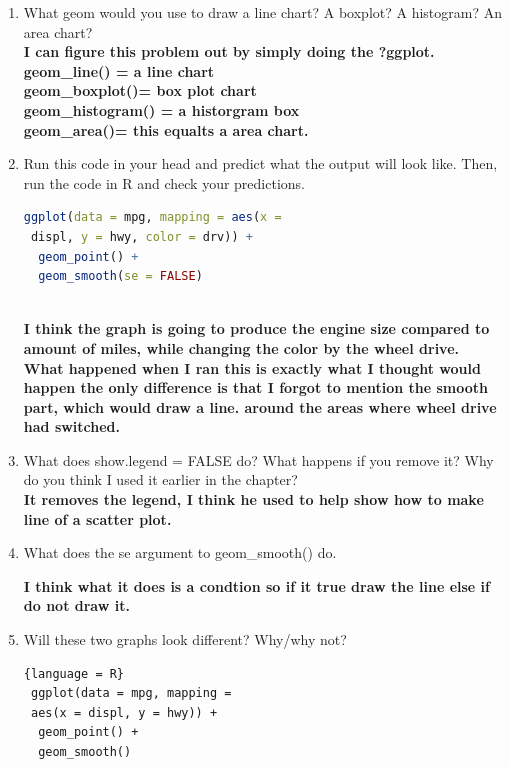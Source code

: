 \documentclass[11pt]{article}
\begin{document}
     \begin{enumerate}
         \item What geom would you use to draw a line chart? A boxplot? A histogram? An area chart? \\
\textbf{I can figure this problem out by simply doing the ?ggplot.\\ 
 geom\_line() = a line chart\\ 
 geom\_boxplot()= box plot chart\\ 
geom\_histogram() = a historgram box\\
geom\_area()= this equalts a area chart.} 

\item Run this code in your head and predict what the output will look like. Then, run the code in R and check your predictions.

\begin{lstlisting}[language= R]
 ggplot(data = mpg, mapping = aes(x =
 displ, y = hwy, color = drv)) + 
  geom_point() + 
  geom_smooth(se = FALSE)
    
\end{lstlisting}

\textbf{I think the graph is going to produce the engine size compared to amount of miles, while changing the color by the wheel drive.} \\

\textbf{What happened when I ran this is exactly what I thought would happen the only difference is that I forgot to mention the smooth part, which would draw a line. around the areas where wheel drive had switched. 
}

\item What does show.legend = FALSE do? What happens if you remove it?
Why do you think I used it earlier in the chapter?\\

\textbf{It removes the legend, I think he used to help show how to make line of a scatter plot. }

\item What does the se argument to geom\_smooth() do.

\textbf{I think what it does is a condtion so if it true draw the line else if do not draw it. }

\item Will these two graphs look different? Why/why not?

\begin{lstlisting}{language = R}
 ggplot(data = mpg, mapping = 
 aes(x = displ, y = hwy)) + 
  geom_point() + 
  geom_smooth()


\end{lstlisting}
\end{enumerate}
\end{document}
